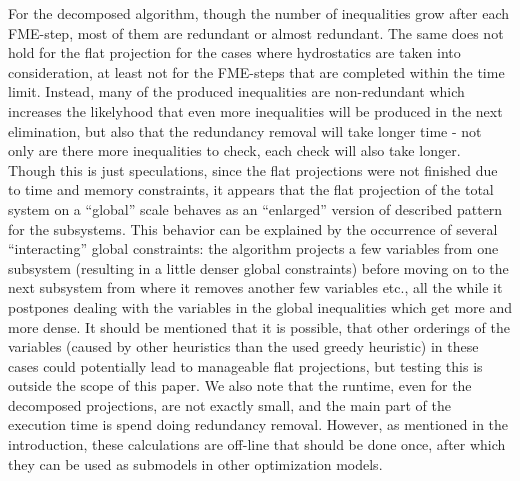 \documentclass[citeauthoryear]{llncs}
\begin{document}
For the decomposed algorithm, though the number of inequalities grow after each FME-step, most of them are redundant or almost redundant. The same does not hold for the flat projection for the cases where hydrostatics are taken into consideration, at least not for the FME-steps that are completed within the time limit. Instead, many of the produced inequalities are non-redundant which increases the likelyhood that even more inequalities will be produced in the next elimination, but also that the redundancy removal will take longer time - not only are there more inequalities to check, each check will also take longer. Though this is just speculations, since the flat projections were not finished due to time and memory constraints, it appears that the flat projection of the total system on a ``global'' scale behaves as an ``enlarged'' version of described pattern for the subsystems.
This behavior can be explained by the occurrence of several ``interacting'' global constraints: the algorithm projects a few variables from one subsystem (resulting in a little denser global constraints) before moving on to the next subsystem from where it removes another few variables etc., all the while it postpones dealing with the variables in the global inequalities which get more and more dense. It should be mentioned that it is possible, that other orderings of the variables (caused by other heuristics than the used greedy heuristic) in these cases could potentially lead to manageable flat projections, but testing this is outside the scope of this paper.  
We also note that the runtime, even for the decomposed projections, are not exactly small, and the main part of the execution time is spend doing redundancy removal. However, as mentioned in the introduction, these calculations are off-line that should be done once, after which they can be used as submodels in other optimization models.  
\end{document}
